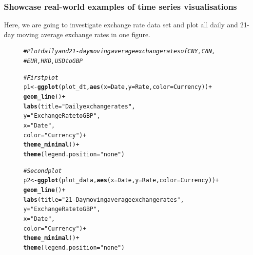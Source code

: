 \documentclass{article}\usepackage[]{graphicx}\usepackage[]{xcolor}
\makeatletter
\newcommand{\hlstr}[1]{\textcolor[rgb]{0.192,0.494,0.8}{#1}}%
\newcommand{\hlcom}[1]{\textcolor[rgb]{0.678,0.584,0.686}{\textit{#1}}}%
\newcommand{\hlopt}[1]{\textcolor[rgb]{0,0,0}{#1}}%
\newcommand{\hlstd}[1]{\textcolor[rgb]{0.345,0.345,0.345}{#1}}%
\newcommand{\hlkwb}[1]{\textcolor[rgb]{0.69,0.353,0.396}{#1}}%
\newcommand{\hlkwc}[1]{\textcolor[rgb]{0.333,0.667,0.333}{#1}}%
\newcommand{\hlkwd}[1]{\textcolor[rgb]{0.737,0.353,0.396}{\textbf{#1}}}%
\newenvironment{kframe}{%
 \def\at@end@of@kframe{}%
 \ifinner\ifhmode%
  \def\at@end@of@kframe{\end{minipage}}%
  \begin{minipage}{\columnwidth}%
 \fi\fi%
 \def\FrameCommand##1{\hskip\@totalleftmargin \hskip-\fboxsep
 \colorbox{shadecolor}{##1}\hskip-\fboxsep
     \hskip-\linewidth \hskip-\@totalleftmargin \hskip\columnwidth}%
 \MakeFramed {\advance\hsize-\width
   \@totalleftmargin\z@ \linewidth\hsize
   \@setminipage}}%
 {\par\unskip\endMakeFramed%
 \at@end@of@kframe}
\newenvironment{knitrout}{}{} %
\makeatother
\begin{document}
\subsubsection{Showcase real-world examples of time series visualisations}

Here, we are going to investigate exchange rate data set and plot all daily and 21-day moving average exchange rates in one figure.




\begin{figure}
\begin{knitrout}
\color{fgcolor}\begin{kframe}
\begin{alltt}
\hlcom{# Plot daily and 21-day moving average exchange rates of CNY, CAN,}
\hlcom{# EUR, HKD, USD to GBP}

\hlcom{# First plot}
\hlstd{p1} \hlkwb{<-} \hlkwd{ggplot}\hlstd{(plot_dt,} \hlkwd{aes}\hlstd{(}\hlkwc{x}\hlstd{=Date,} \hlkwc{y}\hlstd{=Rate,} \hlkwc{color}\hlstd{=Currency))} \hlopt{+}
  \hlkwd{geom_line}\hlstd{()} \hlopt{+}
  \hlkwd{labs}\hlstd{(}\hlkwc{title}\hlstd{=}\hlstr{"Daily exchange rates"}\hlstd{,}
       \hlkwc{y}\hlstd{=}\hlstr{"Exchange Rate to GBP"}\hlstd{,}
       \hlkwc{x}\hlstd{=}\hlstr{"Date"}\hlstd{,}
       \hlkwc{color}\hlstd{=}\hlstr{"Currency"}\hlstd{)}\hlopt{+}
  \hlkwd{theme_minimal}\hlstd{()}\hlopt{+}
  \hlkwd{theme}\hlstd{(}\hlkwc{legend.position}\hlstd{=}\hlstr{"none"}\hlstd{)}

\hlcom{# Second plot}
\hlstd{p2} \hlkwb{<-} \hlkwd{ggplot}\hlstd{(plot_data,} \hlkwd{aes}\hlstd{(}\hlkwc{x}\hlstd{=Date,} \hlkwc{y}\hlstd{=Rate,} \hlkwc{color}\hlstd{=Currency))} \hlopt{+}
  \hlkwd{geom_line}\hlstd{()} \hlopt{+}
  \hlkwd{labs}\hlstd{(}\hlkwc{title}\hlstd{=}\hlstr{"21-Day moving average exchange rates"}\hlstd{,}
       \hlkwc{y}\hlstd{=}\hlstr{"Exchange Rate to GBP"}\hlstd{,}
       \hlkwc{x}\hlstd{=}\hlstr{"Date"}\hlstd{,}
       \hlkwc{color}\hlstd{=}\hlstr{"Currency"}\hlstd{)}\hlopt{+}
  \hlkwd{theme_minimal}\hlstd{()}\hlopt{+}
  \hlkwd{theme}\hlstd{(}\hlkwc{legend.position}\hlstd{=}\hlstr{"none"}\hlstd{)}


\end{alltt}
\end{kframe}
\end{knitrout}
\end{figure}
\end{document}
